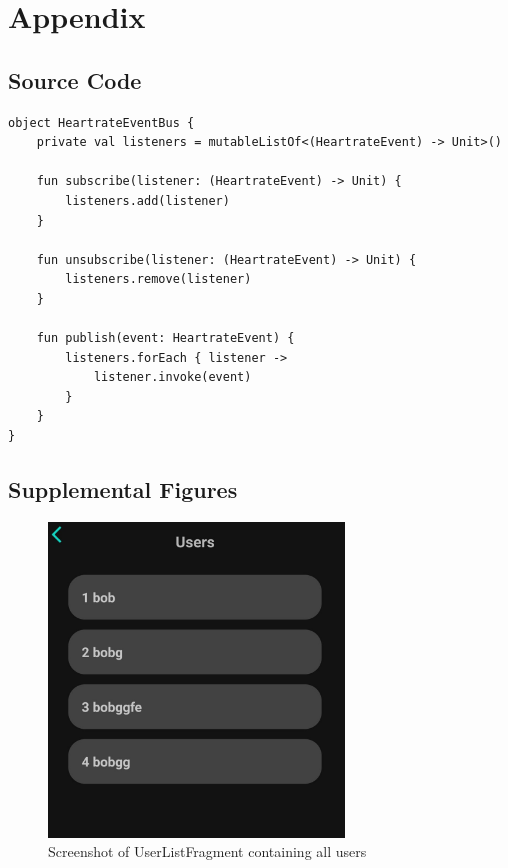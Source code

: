 \appendix


\chapter{Appendix}


\section{Source Code}
\begin{lstlisting}[caption={Implementation of EventBus (Kotlin - HeartrateEventBus)}]
object HeartrateEventBus {
    private val listeners = mutableListOf<(HeartrateEvent) -> Unit>()

    fun subscribe(listener: (HeartrateEvent) -> Unit) {
        listeners.add(listener)
    }

    fun unsubscribe(listener: (HeartrateEvent) -> Unit) {
        listeners.remove(listener)
    }

    fun publish(event: HeartrateEvent) {
        listeners.forEach { listener ->
            listener.invoke(event)
        }
    }
}
\end{lstlisting}

\section{Supplemental Figures}
\begin{figure}[H]
    \centering
    \includegraphics[width=0.7\textwidth]{images/userlistfragment-screenshot.jpeg}
    \caption{Screenshot of UserListFragment containing all users}
    \label{fig:userlistfragment}
\end{figure}